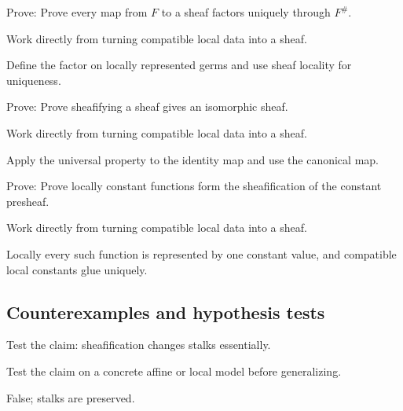 \begin{exercise}\label{exr:vi14-expand-07}
Prove: Prove every map from $F$ to a sheaf factors uniquely through $F^\#$.
\end{exercise}
\begin{hint}
Work directly from turning compatible local data into a sheaf.
\end{hint}
\begin{solution}
Define the factor on locally represented germs and use sheaf locality for uniqueness.
\end{solution}

\begin{exercise}[Idempotence]\label{exr:vi14-expand-08}
Prove: Prove sheafifying a sheaf gives an isomorphic sheaf.
\end{exercise}
\begin{hint}
Work directly from turning compatible local data into a sheaf.
\end{hint}
\begin{solution}
Apply the universal property to the identity map and use the canonical map.
\end{solution}

\begin{exercise}\label{exr:vi14-expand-09}
Prove: Prove locally constant functions form the sheafification of the constant presheaf.
\end{exercise}
\begin{hint}
Work directly from turning compatible local data into a sheaf.
\end{hint}
\begin{solution}
Locally every such function is represented by one constant value, and compatible local constants glue uniquely.
\end{solution}

\subsection*{Counterexamples and hypothesis tests}

\begin{exercise}\label{exr:vi14-expand-10}
Test the claim: sheafification changes stalks essentially.
\end{exercise}
\begin{hint}
Test the claim on a concrete affine or local model before generalizing.
\end{hint}
\begin{solution}
False; stalks are preserved.
\end{solution}

